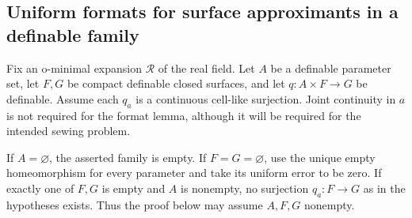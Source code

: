 \subsection{Uniform formats for surface approximants in a definable family}

Fix an o-minimal expansion $\mathcal R$ of the real field. Let $A$ be a
definable parameter set, let $F,G$ be compact definable closed surfaces,
and let $q:A\times F\to G$ be definable. Assume each $q_a$ is a continuous
cell-like surjection. Joint continuity in $a$ is not required for the
format lemma, although it will be required for the intended sewing problem.

If $A=\varnothing$, the asserted family is empty. If $F=G=\varnothing$,
use the unique empty homeomorphism for every parameter and take its uniform
error to be zero. If exactly one of $F,G$ is empty and $A$ is nonempty, no
surjection $q_a:F\to G$ as in the hypotheses exists. Thus the proof below
may assume $A,F,G$ nonempty.

